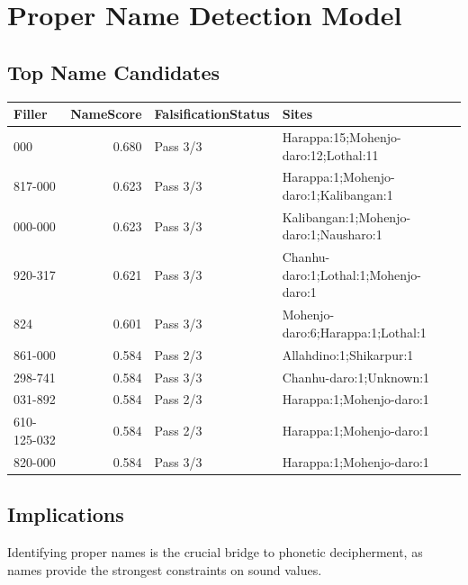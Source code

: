 \section{Proper Name Detection Model}

\subsection{Top Name Candidates}
\begin{tabular}{lrlp{}}
\toprule
\textbf{Filler} & \textbf{NameScore} & \textbf{FalsificationStatus} & \textbf{Sites} \\
\midrule
000 & 0.680 & Pass 3/3 & Harappa:15;Mohenjo-daro:12;Lothal:11 \\
817-000 & 0.623 & Pass 3/3 & Harappa:1;Mohenjo-daro:1;Kalibangan:1 \\
000-000 & 0.623 & Pass 3/3 & Kalibangan:1;Mohenjo-daro:1;Nausharo:1 \\
920-317 & 0.621 & Pass 3/3 & Chanhu-daro:1;Lothal:1;Mohenjo-daro:1 \\
824 & 0.601 & Pass 3/3 & Mohenjo-daro:6;Harappa:1;Lothal:1 \\
861-000 & 0.584 & Pass 2/3 & Allahdino:1;Shikarpur:1 \\
298-741 & 0.584 & Pass 3/3 & Chanhu-daro:1;Unknown:1 \\
031-892 & 0.584 & Pass 2/3 & Harappa:1;Mohenjo-daro:1 \\
610-125-032 & 0.584 & Pass 2/3 & Harappa:1;Mohenjo-daro:1 \\
820-000 & 0.584 & Pass 3/3 & Harappa:1;Mohenjo-daro:1 \\
\bottomrule
\end{tabular}

\subsection{Implications}
Identifying proper names is the crucial bridge to phonetic decipherment, as names provide the strongest constraints on sound values.
